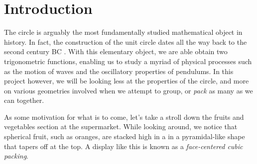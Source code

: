 \chapter{Introduction}

\begin{flushleft}
The circle is arguably the most fundamentally studied mathematical object in history. In fact, the construction of the unit circle dates all the way back to the second century BC \cite{unit_circle}. With this elementary object, we are able obtain two trigonometric functions, enabling us to study a myriad of physical processes such as the motion of waves and the oscillatory properties of pendulums. In this project however, we will be looking less at the properties of the circle, and more on various geometries involved when we attempt to group, or \textit{pack} as many as we can together. 
\end{flushleft}

\begin{flushleft}
As some motivation for what is to come, let's take a stroll down the fruits and vegetables section at the supermarket. While looking around, we notice that spherical fruit, such as oranges, are stacked high in a in a pyramidal-like shape that tapers off at the top. A display like this is known as a \textit{face-centered cubic packing}.
\end{flushleft}

